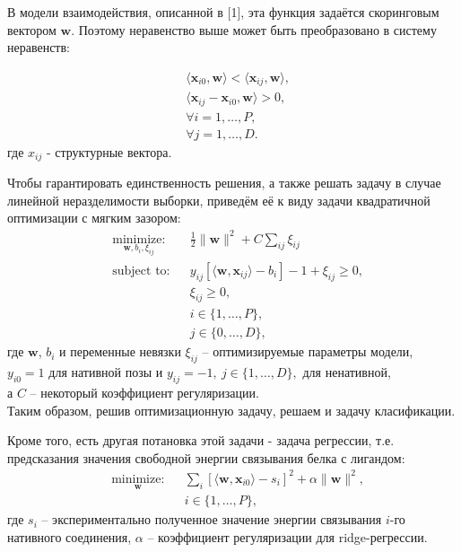 \documentclass[12pt,twoside]{article}
\begin{document}
В модели взаимодействия, описанной в [1], эта функция задаётся скоринговым вектором $\mathbf{w}$. Поэтому неравенство выше может быть преобразовано в систему неравенств:
 
\begin{equation}\label{eq9}
\begin{split}
& \langle\mathbf{x}_{i0}, \mathbf{w}\rangle < \langle\mathbf{x}_{ij}, \mathbf{w}\rangle, \\
& \langle\mathbf{x}_{ij} - \mathbf{x}_{i0}, \mathbf{w}\rangle > 0, \\
& \forall i = 1,\dots, P, \\
& \forall j = 1, \dots, D.
\end{split}
\end{equation}
где $x_{ij}$ - структурные вектора.  

Чтобы гарантировать единственность решения, а также решать задачу в случае линейной неразделимости выборки, приведём её к виду задачи квадратичной оптимизации с мягким зазором:
\begin{equation}\label{eq10}
\begin{aligned}
& \underset{\mathbf{w}, b_i, \xi_{ij}}{\text{minimize:}}
& & \frac{1}{2} \|\mathbf{w}\|^2 + C\sum\limits_{ij}\xi_{ij} \\
& \text{subject to:}
& & y_{ij}[\langle\mathbf{w},\mathbf{x}_{ij}\rangle - b_i]-1+\xi_{ij} \geq 0, \\
&&& \xi_{ij} \geq 0,\\
&&&i\in\{1,\dots,P\}, \\
&&&j\in\{0,\dots,D\},
\end{aligned}
\end{equation}
где $\mathbf{w}$, $b_i$ и переменные невязки $\xi_{ij}$ -- оптимизируемые параметры модели, \\
$y_{i0}=1$ для нативной позы и $y_{ij}=-1, \ j\in\{1,\dots,D\},$ для ненативной,\\
а $C$ -- некоторый коэффициент регуляризации. \\
Таким образом, решив оптимизационную задачу, решаем и задачу класификации.

Кроме того, есть другая потановка этой задачи - задача регрессии, т.е. предсказания значения свободной энергии связывания белка с лигандом:
\begin{equation}\label{eq11}
\begin{aligned}
& \underset{\mathbf{w}}{\text{minimize:}}
& & \sum\limits_{i}[\langle\mathbf{w},\mathbf{x}_{i0}\rangle - s_i]^2 + \alpha\|\mathbf{w}\|^2, \\
&&& i\in\{1,\dots,P\},
\end{aligned}
\end{equation}
где $s_i$ -- экспериментально полученное значение энергии связывания $i$-го нативного соединения, $\alpha$ -- коэффициент регуляризации для ridge-регрессии. 
\end{document}
